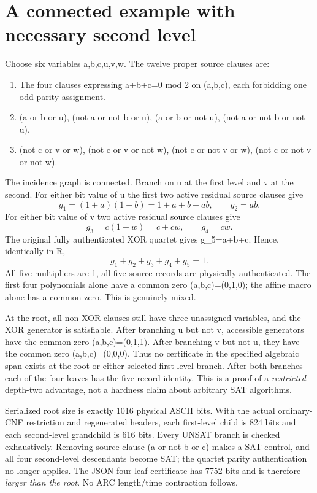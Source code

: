 \documentclass[11pt]{article}
\begin{document}
\section{A connected example with necessary second level}
Choose six variables a,b,c,u,v,w. The twelve proper source clauses are:
\begin{enumerate}
\item The four clauses expressing a+b+c=0 mod 2 on (a,b,c), each forbidding one odd-parity assignment.
\item (a or b or u), (not a or not b or u), (a or b or not u), (not a or not b or not u).
\item (not c or v or w), (not c or v or not w), (not c or not v or w), (not c or not v or not w).
\end{enumerate}
The incidence graph is connected. Branch on u at the first level and v at the second. For either bit value of u the first two active residual source clauses give
\[
g_1=(1+a)(1+b)=1+a+b+ab,\qquad g_2=ab.
\]
For either bit value of v two active residual source clauses give
\[
g_3=c(1+w)=c+cw,\qquad g_4=cw.
\]
The original fully authenticated XOR quartet gives g_5=a+b+c. Hence, identically in R,
\[
\boxed{g_1+g_2+g_3+g_4+g_5=1.}
\]
All five multipliers are 1, all five source records are physically authenticated. The first four polynomials alone have a common zero (a,b,c)=(0,1,0); the affine macro alone has a common zero. This is genuinely mixed.

At the root, all non-XOR clauses still have three unassigned variables, and the XOR generator is satisfiable. After branching u but not v, accessible generators have the common zero (a,b,c)=(0,1,1). After branching v but not u, they have the common zero (a,b,c)=(0,0,0). Thus no certificate in the specified algebraic span exists at the root or either selected first-level branch. After both branches each of the four leaves has the five-record identity. This is a proof of a \emph{restricted} depth-two advantage, not a hardness claim about arbitrary SAT algorithms.

Serialized root size is exactly 1016 physical ASCII bits. With the actual ordinary-CNF restriction and regenerated headers, each first-level child is 824 bits and each second-level grandchild is 616 bits. Every UNSAT branch is checked exhaustively. Removing source clause (a or not b or c) makes a SAT control, and all four second-level descendants become SAT; the quartet parity authentication no longer applies. The JSON four-leaf certificate has 7752 bits and is therefore \emph{larger than the root}. No ARC length/time contraction follows.
\end{document}
